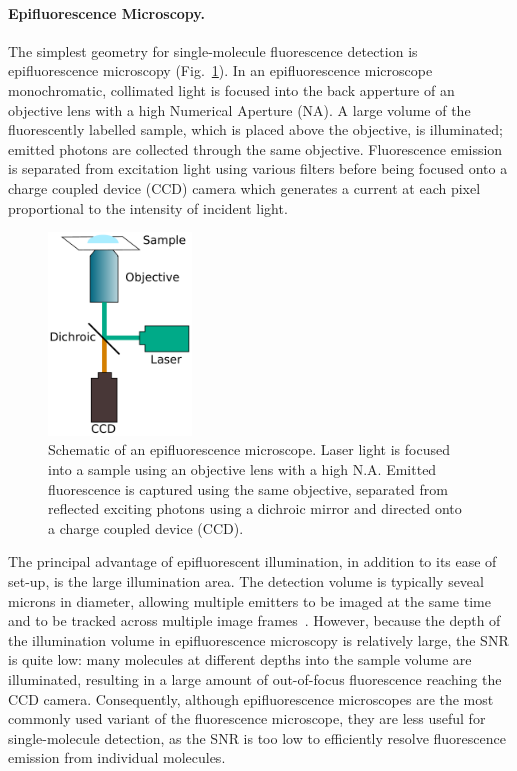 \paragraph{Epifluorescence Microscopy.}
The simplest geometry for single-molecule fluorescence detection is epifluorescence microscopy (Fig.~\ref{fig:epi}). In an epifluorescence microscope monochromatic, collimated light is focused into the back apperture of an objective lens with a high Numerical Aperture (NA). A large volume of the fluorescently labelled sample, which is placed above the objective, is illuminated; emitted photons are collected through the same objective. Fluorescence emission is separated from excitation light using various filters before being focused onto a charge coupled device (CCD) camera which generates a current at each pixel proportional to the intensity of incident light.

\begin{figure}
	\begin{center}
	\includegraphics*[clip=true, width=1.5in]{introduction/epi.pdf}
	\caption{Schematic of an epifluorescence microscope. Laser light is focused into a sample using an objective lens with a high N.A. Emitted fluorescence is captured using the same objective, separated from reflected exciting photons using a dichroic mirror and directed onto a charge coupled device (CCD).}
	\label{fig:epi}
	\end{center}
\end{figure}

The principal advantage of epifluorescent illumination, in addition to its ease of set-up, is the large illumination area. The detection volume is typically seveal microns in diameter, allowing multiple emitters to be imaged at the same time and to be tracked across multiple image frames~\cite{Webb2014}. However, because the depth of the illumination volume in epifluorescence microscopy is relatively large, the SNR is quite low: many molecules at different depths into the sample volume are illuminated, resulting in a large amount of out-of-focus fluorescence reaching the CCD camera. Consequently, although epifluorescence microscopes are the most commonly used variant of the fluorescence microscope, they are less useful for single-molecule detection, as the SNR is too low to efficiently resolve fluorescence emission from individual molecules.

